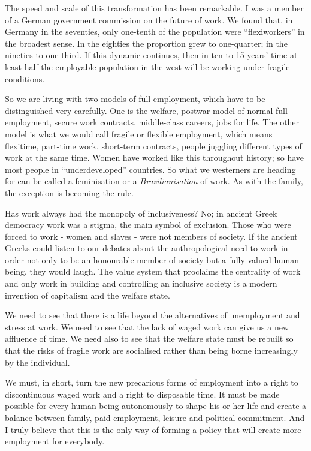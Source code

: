 \documentclass[
]{book}
\begin{document}
The speed and scale of this transformation has been remarkable. I was a member of a German government commission on the future of work. We found that, in Germany in the seventies, only one-tenth of the population were ``flexiworkers'' in the broadest sense. In the eighties the proportion grew to one-quarter; in the nineties to one-third. If this dynamic continues, then in ten to 15 years' time at least half the employable population in the west will be working under fragile conditions.

So we are living with two models of full employment, which have to be distinguished very carefully. One is the welfare, postwar model of normal full employment, secure work contracts, middle-class careers, jobs for life. The other model is what we would call fragile or flexible employment, which means flexitime, part-time work, short-term contracts, people juggling different types of work at the same time. Women have worked like this throughout history; so have most people in ``underdeveloped'' countries. So what we westerners are heading for can be called a feminisation or a \emph{Brazilianisation} of work. As with the family, the exception is becoming the rule.

Has work always had the monopoly of inclusiveness? No; in ancient Greek democracy work was a stigma, the main symbol of exclusion. Those who were forced to work - women and slaves - were not members of society. If the ancient Greeks could listen to our debates about the anthropological need to work in order not only to be an honourable member of society but a fully valued human being, they would laugh. The value system that proclaims the centrality of work and only work in building and controlling an inclusive society is a modern invention of capitalism and the welfare state.

We need to see that there is a life beyond the alternatives of unemployment and stress at work. We need to see that the lack of waged work can give us a new affluence of time. We need also to see that the welfare state must be rebuilt so that the risks of fragile work are socialised rather than being borne increasingly by the individual.

We must, in short, turn the new precarious forms of employment into a right to discontinuous waged work and a right to disposable time. It must be made possible for every human being autonomously to shape his or her life and create a balance between family, paid employment, leisure and political commitment. And I truly believe that this is the only way of forming a policy that will create more employment for everybody.
\end{document}
